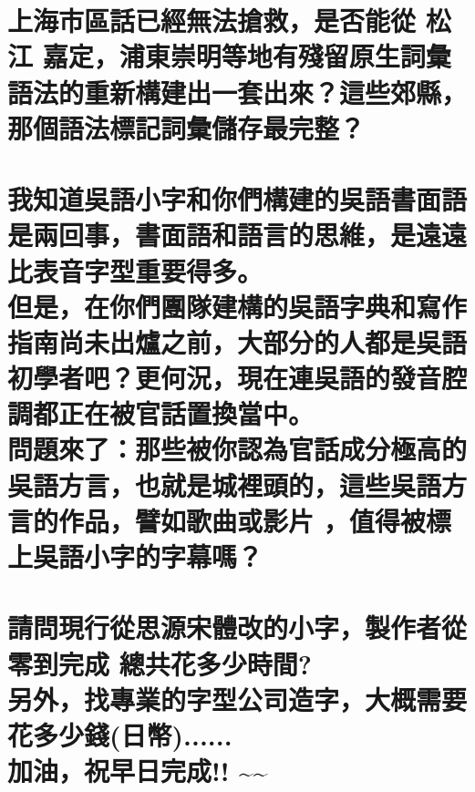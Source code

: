 \chapter[上海市區話已經無法搶救，是否能從 松江 嘉定，浦東崇明等地有殘留原生詞彙語法的重新構建出一套出來？這些郊縣，那個語法標記詞彙儲存最完整？]{上海市區話已經無法搶救，是否能從 松江 嘉定，浦東崇明等地有殘留原生詞彙語法的重新構建出一套出來？這些郊縣，那個語法標記詞彙儲存最完整？}

\chapter[我知道吳語小字和你們構建的吳語書面語是兩回事，書面語和語言的思維，是遠遠比表音字型重要得多。 但是，在你們團隊建構的吳語字典和寫作指南尚未出爐之前，大部分的人都是吳語初學者吧？更何況，現在連吳語的發音腔調都正在被官話置換當中。 問題來了：那些被你認為官話成分極高的吳語方言（城裡的），這些吳語方言的作品（歌曲或影片） ，值得被標上吳語小字的字幕嗎？ ]{我知道吳語小字和你們構建的吳語書面語是兩回事，書面語和語言的思維，是遠遠比表音字型重要得多。 \\[0.35em] 但是，在你們團隊建構的吳語字典和寫作指南尚未出爐之前，大部分的人都是吳語初學者吧？更何況，現在連吳語的發音腔調都正在被官話置換當中。 \\[0.35em] 問題來了：那些被你認為官話成分極高的吳語方言，也就是城裡頭的，這些吳語方言的作品，譬如歌曲或影片 ，值得被標上吳語小字的字幕嗎？ \\}

\chapter[請問現行從思源宋體改的小字，製作者從零到完成 總共花多少時間? 另外，找專業的字型公司造字，大概需要花多少錢？(日幣)...... 加油，祝早日完成!! \textasciitilde{}\textasciitilde{}]{請問現行從思源宋體改的小字，製作者從零到完成 總共花多少時間? \\[0.35em] 另外，找專業的字型公司造字，大概需要花多少錢(日幣)...... \\[0.35em] 加油，祝早日完成!! \textasciitilde{}\textasciitilde{}}

